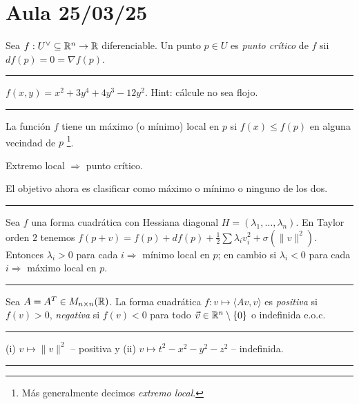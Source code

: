 \section*{Aula 25/03/25}

\begin{definition}
    Sea \(f:U^\ab\subseteq \R^n \to \R\) diferenciable. Un punto \(p\in U\) es \emph{punto crítico} de \(f\) sii \(df(p)=0=\nabla f(p)\). 
\end{definition}

\E

\hrule 
\begin{example}
    \(f(x,y) = x^2 + 3y^4+ 4y^3 - 12y^2\). Hint: cálcule no sea flojo. 
\end{example}
\hrule 

\E

\begin{definition}
    La función \(f\) tiene un máximo (o mínimo) local en \(p\) si \(f(x) \leq f(p)\) en alguna vecindad de \(p\) \footnote{Más generalmente decimos \emph{extremo local}.}.  
\end{definition}
\begin{proposition}
    Extremo local  \(\Rightarrow \) punto crítico. 
\end{proposition}
\begin{note}
    El objetivo ahora es clasificar como máximo o mínimo o ninguno de los dos. 
\end{note}

\E

\hrule 
\begin{example}
    Sea \(f\) una forma cuadrática con Hessiana diagonal \(H= (\lambda_1, \ldots,\lambda_n)\). En Taylor orden $2$ tenemos \(f(p+v)= f(p) + df(p) + \frac{1}{2}\sum \lambda_i v_i^2 + \sigma(\|v\|^2)\). Entonces \(\lambda_i > 0 \) para cada \(i \Rightarrow \) mínimo local en \(p\); en cambio si \(\lambda_i <0\) para cada \(i \Rightarrow \) máximo local en \(p\). 
\end{example}
\hrule 

\E

\begin{definition}
    Sea \(A = A^T\in M_{n\times n}(\mathbb{R})\). La forma cuadrática \(f: v\mapsto \langle Av, v\rangle\) es \emph{positiva} si \(f(v)>0\), \emph{negativa} si \(f(v)<0\) para todo \(\vec{v}\in \mathbb{R}^n\setminus \{0\}\) o indefinida e.o.c.
\end{definition}

\E

\hrule 
\begin{example}
    (i) \(v\mapsto \|v\|^2\) -- positiva y (ii) \(v\mapsto t^2-x^2-y^2-z^2\) -- indefinida. 
\end{example}
\hrule 


